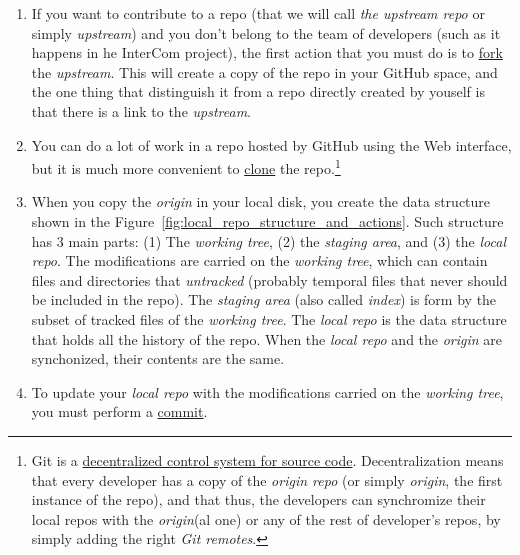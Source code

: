 \begin{enumerate}

\item If you want to contribute to a repo (that we will call \emph{the
upstream repo} or simply \emph{upstream}) \cite{Git-workflow} and you
  don't belong to the team of developers (such as it happens in he
  InterCom project), the first action that you must do is to
  \href{https://docs.github.com/en/github/getting-started-with-github/fork-a-repo}{fork}
  the \emph{upstream}. This will create a copy of the repo in your
  GitHub space, and the one thing that distinguish it from a repo
  directly created by youself is that there is a link to the
  \emph{upstream}.

\item You can do a lot of work in a repo hosted by GitHub using the
  Web interface, but it is much more convenient to
  \href{https://docs.github.com/en/github/creating-cloning-and-archiving-repositories/cloning-a-repository}{clone}
  the repo.\footnote{Git is a
  \href{https://nvie.com/posts/a-successful-git-branching-model/}{decentralized
    control system for source code}. Decentralization means that every
  developer has a copy of the \emph{origin repo} (or simply
  \emph{origin}, the first instance of the repo), and that thus, the
  developers can synchromize their local repos with the
  \emph{origin}(al one) or any of the rest of developer's repos, by
  simply adding the right \emph{Git remotes}.}

\item When you copy the \emph{origin} in your local disk, you create
  the data structure shown in the
  Figure~\ref{fig:local_repo_structure_and_actions}. Such structure
  has 3 main parts: (1) The \emph{working tree}, (2) the \emph{staging
  area}, and (3) the \emph{local repo}. The modifications are carried
  on the \emph{working tree}, which can contain files and directories
  that \emph{untracked} (probably temporal files that never should be
  included in the repo). The \emph{staging area} (also called
  \emph{index}) is form by the subset of tracked files of the
  \emph{working tree}. The \emph{local repo} is the data structure
  that holds all the history of the repo. When the \emph{local repo}
  and the \emph{origin} are synchonized, their contents are the same.

\item To update your \emph{local repo} with the modifications carried
  on the \emph{working tree}, you must perform a
  \href{https://docs.github.com/en/github/getting-started-with-github/github-glossary#commit}{commit}.
  

\end{enumerate}
